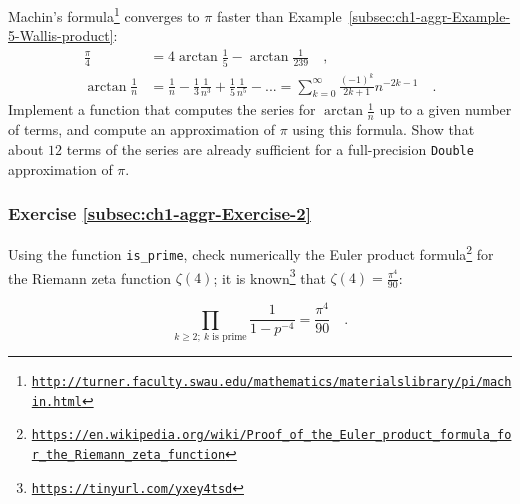 Machin's formula\footnote{\texttt{\href{http://turner.faculty.swau.edu/mathematics/materialslibrary/pi/machin.html}{http://turner.faculty.swau.edu/mathematics/materialslibrary/pi/machin.html}}}
converges to $\pi$ faster than Example~\ref{subsec:ch1-aggr-Example-5-Wallis-product}:
\begin{align*}
\frac{\pi}{4} & =4\arctan\frac{1}{5}-\arctan\frac{1}{239}\quad,\\
\arctan\frac{1}{n} & =\frac{1}{n}-\frac{1}{3}\frac{1}{n^{3}}+\frac{1}{5}\frac{1}{n^{5}}-...=\sum_{k=0}^{\infty}\frac{\left(-1\right)^{k}}{2k+1}n^{-2k-1}\quad.
\end{align*}
Implement a function that computes the series for $\arctan\frac{1}{n}$
up to a given number of terms, and compute an approximation of $\pi$
using this formula. Show that about $12$ terms of the series are
already sufficient for a full-precision \lstinline!Double! approximation
of $\pi$.%
\begin{comment}
Code: def at(n: Double, maxN: Int) = (0 to maxN).map(k => 1.0{*}(1
- k \% 2 {*} 2) / (2{*}k+1) / math.pow(n, 2{*}k+1) ).sum ; def p(n:
Int) = 16{*}at(5, n) - 4{*}at(239, n); p(12)
\end{comment}


\subsubsection{Exercise \label{subsec:ch1-aggr-Exercise-2}\ref{subsec:ch1-aggr-Exercise-2}}

Using the function \lstinline!is_prime!, check numerically the Euler
product formula\footnote{\texttt{\href{https://en.wikipedia.org/wiki/Proof_of_the_Euler_product_formula_for_the_Riemann_zeta_function}{https://en.wikipedia.org/wiki/Proof\_of\_the\_Euler\_product\_formula\_for\_the\_Riemann\_zeta\_function}}}
for the Riemann zeta function $\zeta(4)$;
it is known\footnote{\texttt{\href{https://ocw.mit.edu/courses/mathematics/18-104-seminar-in-analysis-applications-to-number-theory-fall-2006/projects/chan.pdf}{https://tinyurl.com/yxey4tsd}}}
that $\zeta(4)=\frac{\pi^{4}}{90}$:%
\begin{comment}
Code: def is\_prime(n: Int) = (2 to n-1).takeWhile(k => k{*}k <= n).forall(k
=> n \% k != 0); def ep(n: Int): Double = (2 to n).filter(is\_prime).map(k
=> 1.0 / (1.0 - 1.0 / k/k/k/k)).product; ep(100); pi{*}pi{*}pi{*}pi/90;
\end{comment}
\[
\prod_{k\geq2;~k\text{ is prime}}\frac{1}{1-p^{-4}}=\frac{\pi^{4}}{90}\quad.
\]


